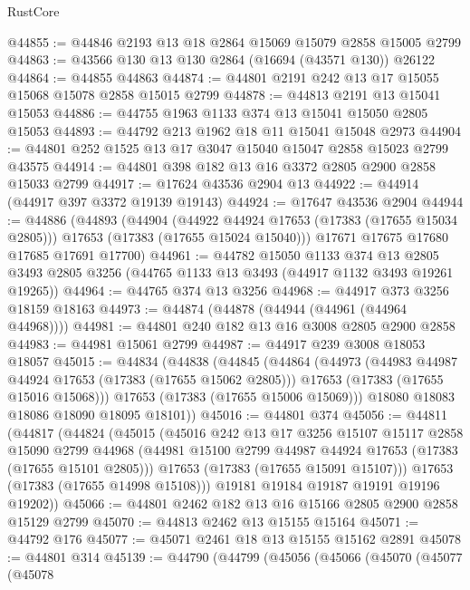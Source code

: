 \begin{lexlean}{RustCore}
\begin{coremodule}
@44855 := @44846 @2193 @13 @18 @2864 @15069 @15079 @2858 @15005 @2799
@44863 := @43566 @130 @13 @130 @2864 (@16694 (@43571 @130)) @26122
@44864 := @44855 @44863
@44874 := @44801 @2191 @242 @13 @17 @15055 @15068 @15078 @2858 @15015 @2799
@44878 := @44813 @2191 @13 @15041 @15053
@44886 := @44755 @1963 @1133 @374 @13 @15041 @15050 @2805 @15053
@44893 := @44792 @213 @1962 @18 @11 @15041 @15048 @2973
@44904 := @44801 @252 @1525 @13 @17 @3047 @15040 @15047 @2858 @15023 @2799 @43575
@44914 := @44801 @398 @182 @13 @16 @3372 @2805 @2900 @2858 @15033 @2799
@44917 := @17624 @43536 @2904 @13
@44922 := @44914 (@44917 @397 @3372 @19139 @19143)
@44924 := @17647 @43536 @2904
@44944 := @44886
    (@44893
      (@44904
        (@44922 @44924 @17653 (@17383 (@17655 @15034 @2805)))
        @17653
        (@17383 (@17655 @15024 @15040)))
      @17671
      @17675
      @17680
      @17685
      @17691
      @17700)
@44961 := @44782
    @15050
    @1133
    @374
    @13
    @2805
    @3493
    @2805
    @3256
    (@44765 @1133 @13 @3493 (@44917 @1132 @3493 @19261 @19265))
@44964 := @44765 @374 @13 @3256
@44968 := @44917 @373 @3256 @18159 @18163
@44973 := @44874 (@44878 (@44944 (@44961 (@44964 @44968))))
@44981 := @44801 @240 @182 @13 @16 @3008 @2805 @2900 @2858
@44983 := @44981 @15061 @2799
@44987 := @44917 @239 @3008 @18053 @18057
@45015 := @44834
    (@44838
      (@44845
        (@44864
          (@44973
            (@44983 @44987 @44924 @17653 (@17383 (@17655 @15062 @2805)))
            @17653
            (@17383 (@17655 @15016 @15068)))
          @17653
          (@17383 (@17655 @15006 @15069)))
        @18080
        @18083
        @18086
        @18090
        @18095
        @18101))
@45016 := @44801 @374
@45056 := @44811
    (@44817
      (@44824
        (@45015
          (@45016
            @242
            @13
            @17
            @3256
            @15107
            @15117
            @2858
            @15090
            @2799
            @44968
            (@44981 @15100 @2799 @44987 @44924 @17653 (@17383 (@17655 @15101 @2805)))
            @17653
            (@17383 (@17655 @15091 @15107)))
          @17653
          (@17383 (@17655 @14998 @15108)))
        @19181
        @19184
        @19187
        @19191
        @19196
        @19202))
@45066 := @44801 @2462 @182 @13 @16 @15166 @2805 @2900 @2858 @15129 @2799
@45070 := @44813 @2462 @13 @15155 @15164
@45071 := @44792 @176
@45077 := @45071 @2461 @18 @13 @15155 @15162 @2891
@45078 := @44801 @314
@45139 := @44790
    (@44799
      (@45056
        (@45066
          (@45070
            (@45077
              (@45078

\end{coremodule}
\end{lexlean}
